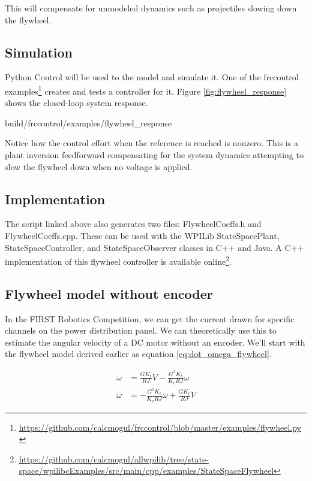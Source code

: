 This will compensate for unmodeled dynamics such as projectiles slowing down the
flywheel.

\subsection{Simulation}

Python Control will be used to  the
\gls{model} and simulate it. One of the frccontrol
examples\footnote{\url{https://github.com/calcmogul/frccontrol/blob/master/examples/flywheel.py}}
creates and tests a controller for it. Figure \ref{fig:flywheel_response} shows
the closed-loop \gls{system} response.

\begin{svg}{build/frccontrol/examples/flywheel_response}
  \caption{Flywheel response}
  \label{fig:flywheel_response}
\end{svg}

Notice how the \gls{control effort} when the \gls{reference} is reached is
nonzero. This is a plant inversion feedforward compensating for the \gls{system}
dynamics attempting to slow the flywheel down when no voltage is applied.

\subsection{Implementation}

The script linked above also generates two files: FlywheelCoeffs.h and
FlywheelCoeffs.cpp. These can be used with the WPILib StateSpacePlant,
StateSpaceController, and StateSpaceObserver classes in C++ and Java. A C++
implementation of this flywheel controller is available online\footnote{
\url{https://github.com/calcmogul/allwpilib/tree/state-space/wpilibcExamples/src/main/cpp/examples/StateSpaceFlywheel}}.

\subsection{Flywheel model without encoder}

In the FIRST Robotics Competition, we can get the current drawn for specific
channels on the power distribution panel. We can theoretically use this to
estimate the angular velocity of a DC motor without an encoder. We'll start with
the flywheel model derived earlier as equation \eqref{eq:dot_omega_flywheel}.

\begin{align*}
  \dot{\omega} &= \frac{G K_t}{RJ} V - \frac{G^2 K_t}{K_v RJ} \omega \\
  \dot{\omega} &= -\frac{G^2 K_t}{K_v RJ} \omega + \frac{G K_t}{RJ} V
\end{align*}

